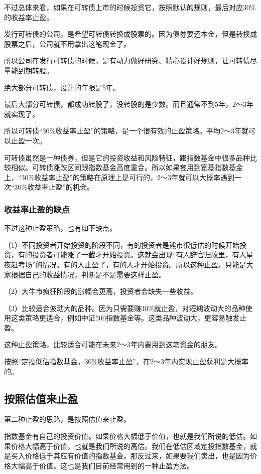 不过总体来看，如果在可转债上市的时候投资它，按照默认的规则，最后对应30\%的收益率止盈。

发行可转债的公司，是希望可转债转换成股票的。因为债券要还本金，但是转换成股票之后，公司就不用拿出这笔现金了。

所以公司在发行可转债的时候，是有动力做好研究、精心设计好规则，让可转债尽量能到期转股。

绝大部分可转债，设计的年限是5年。

最后大部分可转债，都成功转股了，没转股的是少数。而且通常不到5年，2～3年就实现了。

所以可转债“30\%收益率止盈”的策略，是一个很有效的止盈策略。平均2～3年就可以止盈一次。

可转债虽然是一种债券，但是它的投资收益和风险特征，跟指数基金中很多品种比较相似。可转债涨跌区间跟指数基金高度重合。所以如果套用到宽基指数基金上，“30\%收益率止盈”的策略在原理上是可行的，2～3年就可以大概率遇到一次“30\%收益率止盈”的机会。

\subsubsection{收益率止盈的缺点}

不过这种止盈策略，也有如下缺点。

（1）不同投资者开始投资的阶段不同，有的投资者是熊市很低估的时候开始投资，有的投资者可能涨了一截才开始投资。这就会出现“有人辞官归故里，有人星夜赶考场”的情况。有的人止盈了，有的人才开始投资。所以这种止盈，只能是大家根据自己的收益情况，判断是不是需要这样止盈。

（2）大牛市疯狂阶段的涨幅会更高，投资者会缺失一些收益。

（3）比较适合波动大的品种。因为只需要赚30\%就止盈，对短期波动大的品种使用这类策略更适合，例如中证500指数基金等。这类品种波动大，更容易触发止盈。

这种止盈策略，比较适合可能在未来2～3年内要用到这笔资金的朋友。

按照“定投低估指数基金，30\%收益率止盈”，在2～3年内实现止盈获利是大概率的。

\subsection{按照估值来止盈}
第二种止盈的思路，是按照估值来止盈。

指数基金有自己的投资价值。如果价格大幅低于价值，也就是我们所说的低估。如果价格大幅高于价值，也就是我们所说的高估。我们在低估区域定投指数基金，就是买入价格低于其应有价值的指数基金。那反过来，如果要我们卖出，也是因为价格大幅高于价值。这也是我们目前经常用到的一种止盈方法。

